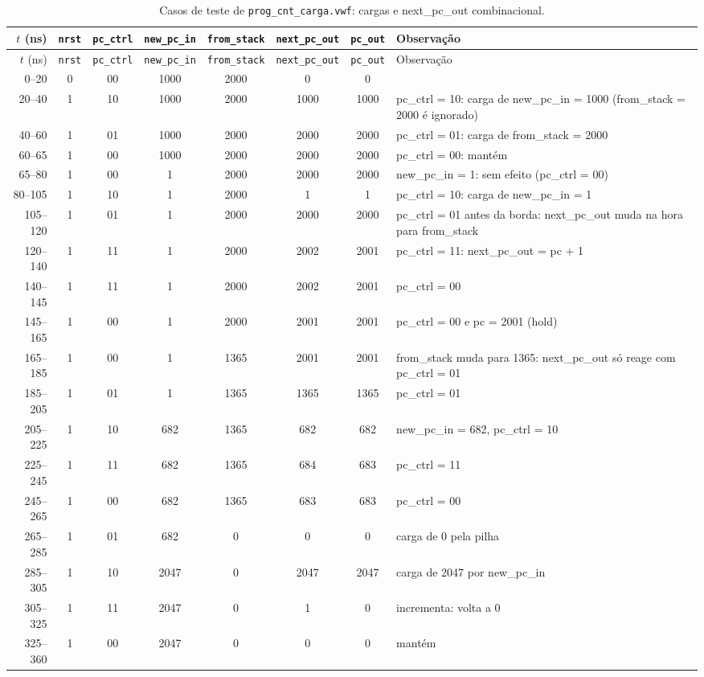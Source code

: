 {\scriptsize\setlength{\tabcolsep}{3pt}
\begin{longtable}{rccccccp{4.2cm}}
\caption{Casos de teste de \texttt{prog\_cnt\_carga.vwf}: cargas e next\_pc\_out combinacional.}
\label{tab:caso-prog-cnt-carga}\\
\hline $t$ (ns) & \texttt{nrst} & \texttt{pc\_ctrl} & \texttt{new\_pc\_in} & \texttt{from\_stack} & \texttt{next\_pc\_out} & \texttt{pc\_out} & Observação \\ \hline \endfirsthead
\hline $t$ (ns) & \texttt{nrst} & \texttt{pc\_ctrl} & \texttt{new\_pc\_in} & \texttt{from\_stack} & \texttt{next\_pc\_out} & \texttt{pc\_out} & Observação \\ \hline \endhead
0--20 & 0 & 00 & 1000 & 2000 & 0 & 0 &  \\
20--40 & 1 & 10 & 1000 & 2000 & 1000 & 1000 & pc\_ctrl = 10: carga de new\_pc\_in = 1000 (from\_stack = 2000 é ignorado) \\
40--60 & 1 & 01 & 1000 & 2000 & 2000 & 2000 & pc\_ctrl = 01: carga de from\_stack = 2000 \\
60--65 & 1 & 00 & 1000 & 2000 & 2000 & 2000 & pc\_ctrl = 00: mantém \\
65--80 & 1 & 00 & 1 & 2000 & 2000 & 2000 & new\_pc\_in = 1: sem efeito (pc\_ctrl = 00) \\
80--105 & 1 & 10 & 1 & 2000 & 1 & 1 & pc\_ctrl = 10: carga de new\_pc\_in = 1 \\
105--120 & 1 & 01 & 1 & 2000 & 2000 & 2000 & pc\_ctrl = 01 antes da borda: next\_pc\_out muda na hora para from\_stack \\
120--140 & 1 & 11 & 1 & 2000 & 2002 & 2001 & pc\_ctrl = 11: next\_pc\_out = pc + 1 \\
140--145 & 1 & 11 & 1 & 2000 & 2002 & 2001 & pc\_ctrl = 00 \\
145--165 & 1 & 00 & 1 & 2000 & 2001 & 2001 & pc\_ctrl = 00 e pc = 2001 (hold) \\
165--185 & 1 & 00 & 1 & 1365 & 2001 & 2001 & from\_stack muda para 1365: next\_pc\_out só reage com pc\_ctrl = 01 \\
185--205 & 1 & 01 & 1 & 1365 & 1365 & 1365 & pc\_ctrl = 01 \\
205--225 & 1 & 10 & 682 & 1365 & 682 & 682 & new\_pc\_in = 682, pc\_ctrl = 10 \\
225--245 & 1 & 11 & 682 & 1365 & 684 & 683 & pc\_ctrl = 11 \\
245--265 & 1 & 00 & 682 & 1365 & 683 & 683 & pc\_ctrl = 00 \\
265--285 & 1 & 01 & 682 & 0 & 0 & 0 & carga de 0 pela pilha \\
285--305 & 1 & 10 & 2047 & 0 & 2047 & 2047 & carga de 2047 por new\_pc\_in \\
305--325 & 1 & 11 & 2047 & 0 & 1 & 0 & incrementa: volta a 0 \\
325--360 & 1 & 00 & 2047 & 0 & 0 & 0 & mantém \\
\hline
\end{longtable}}
\vspace{-0.9cm}
